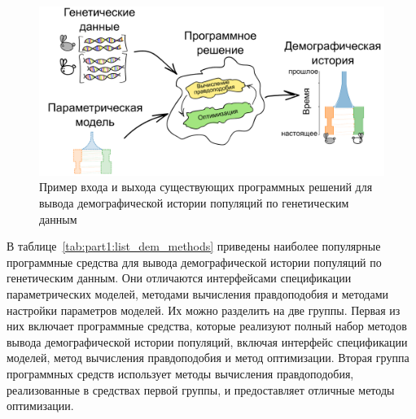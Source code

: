 \begin{figure}[t]
    \includegraphics[width=\textwidth]{images/part1/dem_history/general_scheme.pdf}
    \caption{Пример входа и выхода существующих программных решений для вывода демографической истории популяций по генетическим данным}\label{fig:part1:deminf:general_scheme}
\end{figure}


В таблице~\ref{tab:part1:list_dem_methods} приведены наиболее популярные программные средства для вывода демографической истории популяций по генетическим данным.
Они отличаются интерфейсами спецификации параметрических моделей, методами вычисления правдоподобия и методами настройки параметров моделей.
Их можно разделить на две группы.
Первая из них включает программные средства, которые реализуют полный набор методов вывода демографической истории популяций, включая интерфейс спецификации моделей, метод вычисления правдоподобия и метод оптимизации.
Вторая группа программных средств использует методы вычисления правдоподобия, реализованные в средствах первой группы, и предоставляет отличные методы оптимизации.

